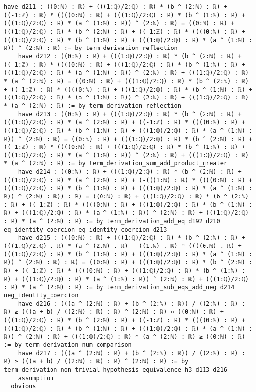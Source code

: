 \documentclass{article}
\begin{document}
\begin{tcolorbox}[colback=white!10, width=\linewidth]
\begin{lstlisting}[language=Lean4]
    have d211 : ((0:ℕ) : ℝ) + (((1:ℚ)/2:ℚ) : ℝ) * (b ^ (2:ℕ) : ℝ) + ((-1:ℤ) : ℝ) * ((((0:ℕ) : ℝ) + (((1:ℚ)/2:ℚ) : ℝ) * (b ^ (1:ℕ) : ℝ) + (((1:ℚ)/2:ℚ) : ℝ) * (a ^ (1:ℕ) : ℝ)) ^ (2:ℕ) : ℝ) = ((0:ℕ) : ℝ) + (((1:ℚ)/2:ℚ) : ℝ) * (b ^ (2:ℕ) : ℝ) + ((-1:ℤ) : ℝ) * ((((0:ℕ) : ℝ) + (((1:ℚ)/2:ℚ) : ℝ) * (b ^ (1:ℕ) : ℝ) + (((1:ℚ)/2:ℚ) : ℝ) * (a ^ (1:ℕ) : ℝ)) ^ (2:ℕ) : ℝ) := by term_derivation_reflection
    have d212 : ((0:ℕ) : ℝ) + (((1:ℚ)/2:ℚ) : ℝ) * (b ^ (2:ℕ) : ℝ) + ((-1:ℤ) : ℝ) * ((((0:ℕ) : ℝ) + (((1:ℚ)/2:ℚ) : ℝ) * (b ^ (1:ℕ) : ℝ) + (((1:ℚ)/2:ℚ) : ℝ) * (a ^ (1:ℕ) : ℝ)) ^ (2:ℕ) : ℝ) + (((1:ℚ)/2:ℚ) : ℝ) * (a ^ (2:ℕ) : ℝ) = ((0:ℕ) : ℝ) + (((1:ℚ)/2:ℚ) : ℝ) * (b ^ (2:ℕ) : ℝ) + ((-1:ℤ) : ℝ) * ((((0:ℕ) : ℝ) + (((1:ℚ)/2:ℚ) : ℝ) * (b ^ (1:ℕ) : ℝ) + (((1:ℚ)/2:ℚ) : ℝ) * (a ^ (1:ℕ) : ℝ)) ^ (2:ℕ) : ℝ) + (((1:ℚ)/2:ℚ) : ℝ) * (a ^ (2:ℕ) : ℝ) := by term_derivation_reflection
    have d213 : ((0:ℕ) : ℝ) + (((1:ℚ)/2:ℚ) : ℝ) * (b ^ (2:ℕ) : ℝ) + (((1:ℚ)/2:ℚ) : ℝ) * (a ^ (2:ℕ) : ℝ) + ((-1:ℤ) : ℝ) * ((((0:ℕ) : ℝ) + (((1:ℚ)/2:ℚ) : ℝ) * (b ^ (1:ℕ) : ℝ) + (((1:ℚ)/2:ℚ) : ℝ) * (a ^ (1:ℕ) : ℝ)) ^ (2:ℕ) : ℝ) = ((0:ℕ) : ℝ) + (((1:ℚ)/2:ℚ) : ℝ) * (b ^ (2:ℕ) : ℝ) + ((-1:ℤ) : ℝ) * ((((0:ℕ) : ℝ) + (((1:ℚ)/2:ℚ) : ℝ) * (b ^ (1:ℕ) : ℝ) + (((1:ℚ)/2:ℚ) : ℝ) * (a ^ (1:ℕ) : ℝ)) ^ (2:ℕ) : ℝ) + (((1:ℚ)/2:ℚ) : ℝ) * (a ^ (2:ℕ) : ℝ) := by term_derivation_sum_add_product_greater
    have d214 : ((0:ℕ) : ℝ) + (((1:ℚ)/2:ℚ) : ℝ) * (b ^ (2:ℕ) : ℝ) + (((1:ℚ)/2:ℚ) : ℝ) * (a ^ (2:ℕ) : ℝ) + (-(((1:ℕ) : ℝ) * ((((0:ℕ) : ℝ) + (((1:ℚ)/2:ℚ) : ℝ) * (b ^ (1:ℕ) : ℝ) + (((1:ℚ)/2:ℚ) : ℝ) * (a ^ (1:ℕ) : ℝ)) ^ (2:ℕ) : ℝ)) : ℝ) = ((0:ℕ) : ℝ) + (((1:ℚ)/2:ℚ) : ℝ) * (b ^ (2:ℕ) : ℝ) + ((-1:ℤ) : ℝ) * ((((0:ℕ) : ℝ) + (((1:ℚ)/2:ℚ) : ℝ) * (b ^ (1:ℕ) : ℝ) + (((1:ℚ)/2:ℚ) : ℝ) * (a ^ (1:ℕ) : ℝ)) ^ (2:ℕ) : ℝ) + (((1:ℚ)/2:ℚ) : ℝ) * (a ^ (2:ℕ) : ℝ) := by term_derivation_add_eq d192 d210 eq_identity_coercion eq_identity_coercion d213
    have d215 : (((0:ℕ) : ℝ) + (((1:ℚ)/2:ℚ) : ℝ) * (b ^ (2:ℕ) : ℝ) + (((1:ℚ)/2:ℚ) : ℝ) * (a ^ (2:ℕ) : ℝ) - ((1:ℕ) : ℝ) * ((((0:ℕ) : ℝ) + (((1:ℚ)/2:ℚ) : ℝ) * (b ^ (1:ℕ) : ℝ) + (((1:ℚ)/2:ℚ) : ℝ) * (a ^ (1:ℕ) : ℝ)) ^ (2:ℕ) : ℝ) : ℝ) = ((0:ℕ) : ℝ) + (((1:ℚ)/2:ℚ) : ℝ) * (b ^ (2:ℕ) : ℝ) + ((-1:ℤ) : ℝ) * ((((0:ℕ) : ℝ) + (((1:ℚ)/2:ℚ) : ℝ) * (b ^ (1:ℕ) : ℝ) + (((1:ℚ)/2:ℚ) : ℝ) * (a ^ (1:ℕ) : ℝ)) ^ (2:ℕ) : ℝ) + (((1:ℚ)/2:ℚ) : ℝ) * (a ^ (2:ℕ) : ℝ) := by term_derivation_sub_eqs_add_neg d214 neg_identity_coercion
    have d216 : (((a ^ (2:ℕ) : ℝ) + (b ^ (2:ℕ) : ℝ)) / ((2:ℕ) : ℝ) : ℝ) ≥ (((a + b) / ((2:ℕ) : ℝ) : ℝ) ^ (2:ℕ) : ℝ) ↔ ((0:ℕ) : ℝ) + (((1:ℚ)/2:ℚ) : ℝ) * (b ^ (2:ℕ) : ℝ) + ((-1:ℤ) : ℝ) * ((((0:ℕ) : ℝ) + (((1:ℚ)/2:ℚ) : ℝ) * (b ^ (1:ℕ) : ℝ) + (((1:ℚ)/2:ℚ) : ℝ) * (a ^ (1:ℕ) : ℝ)) ^ (2:ℕ) : ℝ) + (((1:ℚ)/2:ℚ) : ℝ) * (a ^ (2:ℕ) : ℝ) ≥ ((0:ℕ) : ℝ) := by term_derivation_num_comparison
    have d217 : (((a ^ (2:ℕ) : ℝ) + (b ^ (2:ℕ) : ℝ)) / ((2:ℕ) : ℝ) : ℝ) ≥ (((a + b) / ((2:ℕ) : ℝ) : ℝ) ^ (2:ℕ) : ℝ) := by term_derivation_non_trivial_hypothesis_equivalence h3 d113 d216
    assumption
  obvious

\end{lstlisting}
\end{tcolorbox}
\end{document}
